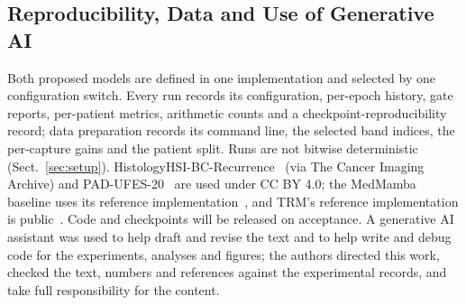 \documentclass{svproc}
\begin{document}
\subsection{Reproducibility, Data and Use of Generative AI}
Both proposed models are defined in one implementation and selected by one configuration switch. Every run records its configuration, per-epoch history, gate reports, per-patient metrics, arithmetic counts and a checkpoint-reproducibility record; data preparation records its command line, the selected band indices, the per-capture gains and the patient split. Runs are not bitwise deterministic (Sect.~\ref{sec:setup}). HistologyHSI-BC-Recurrence~\cite{hsibc_data,hsibc_desc} (via The Cancer Imaging Archive) and PAD-UFES-20~\cite{pad_desc,pad_data} are used under CC BY 4.0; the MedMamba baseline uses its reference implementation~\cite{medmamba_repo}, and TRM's reference implementation is public~\cite{trm_repo}. Code and checkpoints will be released on acceptance. A generative AI assistant was used to help draft and revise the text and to help write and debug code for the experiments, analyses and figures; the authors directed this work, checked the text, numbers and references against the experimental records, and take full responsibility for the content.
\end{document}
